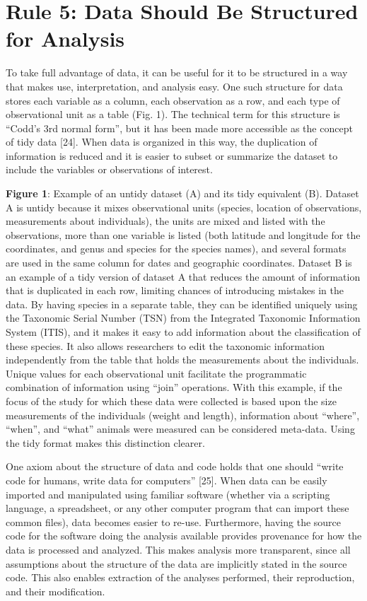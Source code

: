 \documentclass[10pt,letterpaper]{article}
\begin{document}
\section*{Rule 5: Data Should Be Structured for
Analysis}\label{rule-5-data-should-be-structured-for-analysis}

To take full advantage of data, it can be useful for it to be structured
in a way that makes use, interpretation, and analysis easy. One such
structure for data stores each variable as a column, each observation as
a row, and each type of observational unit as a table (Fig. 1). The
technical term for this structure is ``Codd's 3rd normal form'', but it
has been made more accessible as the concept of tidy data {[}24{]}. When
data is organized in this way, the duplication of information is reduced
and it is easier to subset or summarize the dataset to include the
variables or observations of interest.

\textbf{Figure 1}: Example of an untidy dataset (A) and its tidy
equivalent (B). Dataset A is untidy because it mixes observational units
(species, location of observations, measurements about individuals), the
units are mixed and listed with the observations, more than one variable
is listed (both latitude and longitude for the coordinates, and genus
and species for the species names), and several formats are used in the
same column for dates and geographic coordinates. Dataset B is an
example of a tidy version of dataset A that reduces the amount of
information that is duplicated in each row, limiting chances of
introducing mistakes in the data. By having species in a separate table,
they can be identified uniquely using the Taxonomic Serial Number (TSN)
from the Integrated Taxonomic Information System (ITIS), and it makes it
easy to add information about the classification of these species. It
also allows researchers to edit the taxonomic information independently
from the table that holds the measurements about the individuals. Unique
values for each observational unit facilitate the programmatic
combination of information using ``join'' operations. With this example,
if the focus of the study for which these data were collected is based
upon the size measurements of the individuals (weight and length),
information about ``where'', ``when'', and ``what'' animals were
measured can be considered meta-data. Using the tidy format makes this
distinction clearer.

One axiom about the structure of data and code holds that one should
``write code for humans, write data for computers'' {[}25{]}. When data
can be easily imported and manipulated using familiar software (whether
via a scripting language, a spreadsheet, or any other computer program
that can import these common files), data becomes easier to re-use.
Furthermore, having the source code for the software doing the analysis
available provides provenance for how the data is processed and
analyzed. This makes analysis more transparent, since all assumptions
about the structure of the data are implicitly stated in the source
code. This also enables extraction of the analyses performed, their
reproduction, and their modification.
\end{document}
